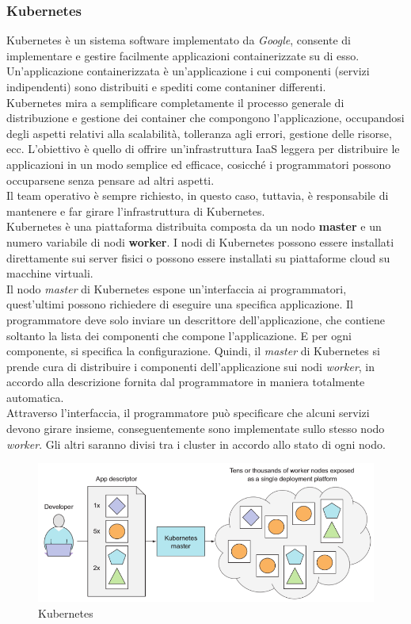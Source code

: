 \documentclass{article}
\begin{document}
\subsubsection{Kubernetes}
Kubernetes è un sistema software implementato da \textit{Google}, consente di implementare e gestire facilmente applicazioni containerizzate su di esso. \\ Un'applicazione containerizzata è un'applicazione i cui componenti (servizi indipendenti) sono distribuiti e spediti come contaniner differenti. \\
Kubernetes mira a semplificare completamente il processo generale di distribuzione e gestione dei container che compongono l'applicazione, occupandosi degli aspetti relativi alla scalabilità, tolleranza agli errori, gestione delle risorse, ecc. L'obiettivo è quello di offrire un'infrastruttura IaaS leggera per distribuire le applicazioni in un modo semplice ed efficace, cosicché i programmatori possono occuparsene senza pensare ad altri aspetti. \\ 
Il team operativo è sempre richiesto, in questo caso, tuttavia, è responsabile di mantenere e far girare l'infrastruttura di Kubernetes. \\
Kubernetes è una piattaforma distribuita composta da un nodo \textbf{master} e un numero variabile di nodi \textbf{worker}. I nodi di Kubernetes possono essere installati direttamente sui server fisici o possono essere installati su piattaforme cloud su macchine virtuali. \\
Il nodo \textit{master} di Kubernetes espone un'interfaccia ai programmatori, quest'ultimi possono richiedere di eseguire una specifica applicazione. Il programmatore deve solo inviare un descrittore dell'applicazione, che contiene soltanto la lista dei componenti che compone l'applicazione. E per ogni componente, si specifica la configurazione. Quindi, il \textit{master} di Kubernetes si prende cura di distribuire i componenti dell'applicazione sui nodi \textit{worker}, in accordo alla descrizione fornita dal programmatore in maniera totalmente automatica. \\
Attraverso l'interfaccia, il programmatore può specificare che alcuni servizi devono girare insieme, conseguentemente sono implementate sullo stesso nodo \textit{worker}. Gli altri saranno divisi tra i cluster in accordo allo stato di ogni nodo. 
\begin{figure}[H]
    \centering
    \includegraphics[scale=0.4]{img/kubernetes.png}
    \caption{Kubernetes}
\end{figure}\noindent
\end{document}
